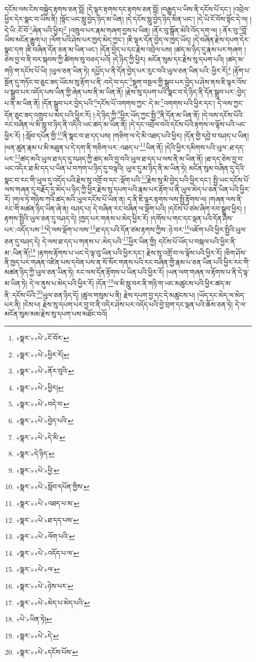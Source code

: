 དངོས་ལས་ངེས་བསྐྱེད་རྟགས་ཅན་བློ། །དེ་ལྟར་རྟགས་དང་རྟགས་ཅན་བློ། །བརྒྱུད་པ་ཡིས་ནི་དངོས་པོ་དང་། །འབྲེལ་ཕྱིར་དེར་སྣང་བ་ཡིས་ནི། །སྟོང་ཡང་སླུ་བྱེད་ཉིད་མ་ཡིན། །དེ་དངོས་སླུ་བྱེད་ཉིད་མིན་ཡང་། །དེ་ཡི་ངོ་བོས་སྟོང་དེ་ལ། །དེ་ཡི་:ངོ་བོ་\footnote{«སྣར་»«པེ་»ངོ་བོར་}ཞེན་པའི་ཕྱིར།\footnote{«སྣར་»«པེ་»ཕྱིར་རོ།} །འཁྲུལ་པར་རྣམ་གཞག་བྱས་པ་ཡིན། །ནོར་བུ་སྒྲོན་མེའི་འོད་དག་ལ། །:ནོར་བུ་\footnote{«སྣར་»«པེ་»ནོར་བུའི་}བློ་ཡིས་མངོན་རྒྱུག་པ། །ལོག་པའི་ཤེས་པར་ཁྱད་མེད་ཀྱང་། །ཇི་ལྟར་དོན་བྱེད་ལ་ཁྱད་ཡོད། །དེ་བཞིན་རྗེས་དཔག་དེར་སྣང་དག །ཇི་བཞིན་དོན་ཅན་མ་ཡིན་ཡང་། །དོན་བྱེད་པ་དང་རྗེས་འབྲེལ་པས། །ཚད་མ་ཉིད་དུ་རྣམ་པར་གཞག །ཅེས་བྱ་བ་ནི་བར་སྐབས་ཀྱི་ཚིགས་སུ་བཅད་པའོ། །དེ་ཉིད་ཀྱི་ཕྱིར། མངོན་སུམ་དང་རྗེས་སུ་དཔག་པའི། །ཚད་མ་གཉི་ག་དངོས་པོ་ཡི། །ཡུལ་ཅན་ཡིན་ཏེ། དཔྱོད་པ་ནི་དོན་བྱེད་པར་རུང་བའི་ཡུལ་ཅན་ཡིན་པའི་:ཕྱིར་རོ།\footnote{«སྣར་»«པེ་»ཕྱིར།} །རྟོག་པ་སྔོན་དུ་གཏོང་བ་ཅུང་ཟད་ཡོངས་སུ་རྟོག་པ་ནི་:བདེ་བ་དང་\footnote{«སྣར་»«པེ་»བདེ་བ་}སྡུག་བསྔལ་གྱི་སྒྲུབ་པར་བྱེད་པ་ཤེས་ནས་ཇི་ལྟར་འོས་པ་སྒྲུབ་པར་འདོད་པས་ཡིན་གྱི་ཞེན་པས་ནི་མ་ཡིན་ནོ། །རྗེས་སུ་དཔག་པའི་སྣང་བ་དེ་ཉིད་ནི་དོན་སྒྲུབ་པར་:བྱེད་པ་ནི་མ་ཡིན་ནོ། །དོན་སྒྲུབ་པར་བྱེད་པའི་\footnote{«སྣར་»«པེ་»བྱེད་པའི་}དངོས་པོ་འགགས་ཀྱང་:དེ་མ་\footnote{«སྣར་»«པེ་»དེ་མི་}འགགས་པའི་ཕྱིར་དང་། དེ་ལས་ཀྱང་དོན་ཅུང་ཟད་འགྲུབ་པ་མེད་པའི་ཕྱིར་རོ། །:དེ་ཉིད་ཀྱི་\footnote{«སྣར་»དེ་ཉིད་}ཕྱིར་ཡོད་ཀྱང་སྤྱི་\footnote{«སྣར་»«པེ་»ཕྱི་}ནི་དོན་མ་ཡིན་ནོ། །དེ་ལས་དངོས་པོའི་རང་བཞིན་ལ་མི་སླུ་བ་ཉིད་ནི་འདིའི་ཡང་ཚད་མ་ཡིན་ནོ། །དེ་དང་འབྲེལ་བའི་དངོས་པོའི་རྟགས་ལ་ལྟོས་པའི་ཡང་ཕྱིར་རོ། །:སློབ་དཔོན་གྱི་\footnote{«སྣར་»«པེ་»སློབ་དཔོན་གྱིས་}ནི་སྣང་བ་ཐ་དད་པས། །གཅིག་ལ་དེ་མི་འཐད་པའི་ཕྱིར། །དོན་གྱི་དབྱེ་བ་བཤད་པ་ཡིན། །ཕན་ཚུན་རྣམ་པ་མི་མཐུན་པ་དེ་དག་ནི་གཅིག་པར་:འཐད་པ་\footnote{«སྣར་»«པེ་»འཐད་པ་མ་}ཡིན་ནོ། །དེའི་ཕྱིར་དམིགས་པའི་ཡུལ་:ཐ་དད་པར་\footnote{«སྣར་»«པེ་»ཐ་དད་པས་}ཚད་མའི་ཡུལ་ཐ་དད་དུ་བཤད་ཀྱི་ཚད་མའི་བྱ་བའི་ཡུལ་ཐ་དད་པ་ལས་ནི་མ་ཡིན་ནོ། །ཐ་དད་ཅེས་བྱ་བ་ཡང་འདིར་ཐ་མི་དད་པ་ཡིན་པ་བཀག་པ་ཉིད་དུ་བལྟའི། ཡུལ་དུ་མ་ཉིད་ནི་མ་ཡིན་ཏེ། མངོན་སུམ་བཞིན་དུ་དེའི་སྣང་བ་རང་གི་ཡུལ་དུ་འདོད་པའི་རྗེས་སུ་འགྲོ་བ་དང་:ལྡོག་པའི་\footnote{«སྣར་»«པེ་»ལོག་པའི་}རྗེས་སུ་མི་བྱེད་པའི་ཕྱིར་དང་། སྤྱི་ཡང་དངོས་པོ་ལས་གཞན་དུ་བརྗོད་དུ་མེད་པ་ཉིད་ཀྱི་ཕྱིར་རྗེས་སུ་དཔག་པའི་རྣམ་པར་རྟོག་པ་ནི་ཡུལ་མེད་པ་ཅན་ཡིན་པའི་ཕྱིར་རོ། །གལ་ཏེ་གཉིས་ཀའི་ཚད་མའི་ཡུལ་དངོས་པོ་ཡིན་ན། ད་ནི་ཇི་ལྟར་རྟགས་ལས་སྤྱི་རྟོགས་ལ། །གཞན་ལས་ནི་རང་གི་མཚན་ཉིད་ཡིན་ཞེ་ན། བཤད་པ། དེ་བཞིན་རང་བཞིན་ལ་ལྡོག་པའི། །དངོས་པོ་ཙམ་ཞིག་རབ་སྒྲུབ་ཕྱིར། །རྟགས་སྤྱིའི་ཡུལ་ཅན་དུ་བཤད་དེ། །ཁྱད་པར་གནས་པ་མེད་ཕྱིར་རོ། །དགོས་པ་གང་དང་ལྡན་པའི་དོན་ཤེས་པར་:འདོད་པས་\footnote{«སྣར་»«པེ་»འདོད་པ་ལ་}དེ་ལས་ལྡོག་པ་ལས་\footnote{«སྣར་»«པེ་»ལ་}ཐ་དད་པའི་དོན་ཙམ་རྟགས་ཀྱིས་:ཉེ་བར་\footnote{«སྣར་»«པེ་»ཉེས་པར་}འཇོག་པའི་ཕྱིར་སྤྱིའི་ཡུལ་ཅན་དུ་བཤད་དེ། དེ་ལས་ཐ་དད་པ་གནས་པ་:མེད་པའི་\footnote{«སྣར་»«པེ་»མེད་པ་མེད་པའི་}ཕྱིར་ཡིན་གྱི། དངོས་པོ་ཡོད་པ་བསྐལ་པའི་ཕྱིར་ནི་མ་:ཡིན་ནོ།\footnote{«པེ་»ཡིན་ཏེ།} །རྟགས་རྟོགས་པ་ཡང་དེ་ལྟ་བུ་ཡིན་པའི་ཕྱིར་དང་། རྗེས་སུ་འགྲོ་བ་ལ་ལྟོས་པའི་ཕྱིར་རོ། །ཅིག་ཤོས་ནི་ཁྱད་པར་གཞན་འཛིན་པས་དབེན་པས་ན་སོ་སོར་གནས་པའི་རང་བཞིན་གྱི་རྣམ་པ་ཅན་ཡིན་པའི་ཕྱིར་རང་གི་མཚན་ཉིད་ཀྱི་ཡུལ་ཅན་ཡིན་ཏེ། རང་ལས་དོན་རྟོགས་པ་ཡིན་པའི་ཕྱིར་རོ། །ཡན་ལག་གཞན་ལ་རྟོགས་པ་ནི་དེ་ལྟ་མ་ཡིན་ཏེ། དེ་ལ་ནུས་པ་མེད་པའི་ཕྱིར་རོ། །དོན་\footnote{«སྣར་»«པེ་»དེ་}ལ་མི་སླུ་བར་ནི་གཉི་ག་ཡང་མཚུངས་པའི་ཕྱིར་ཚད་མ་ནི་:དངོས་པོའི་\footnote{«སྣར་»«པེ་»དངོས་པོས་}ཡུལ་ཅན་ཉིད་དོ། །ཚུལ་གསུམ་པ་ནི། རྗེས་དཔག་བྱ་དང་དེ་མཚུངས་པ། །ཡོད་དང་མེད་ལ་མེད་པར་ནི། །ངེས་པ། རྗེས་སུ་དཔག་པར་བྱ་བ་ནི་འདིར་ཤེས་པར་འདོད་པའི་བྱེ་བྲག་དང་ལྡན་པའི་ཆོས་ཅན་ཏེ། དེ་ལ་མངོན་སུམ་མམ་རྗེས་སུ་དཔག་པས་མཐོང་བའོ། 